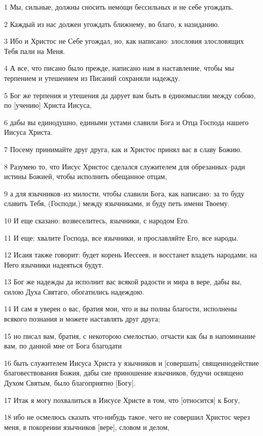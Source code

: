 \par 1 Мы, сильные, должны сносить немощи бессильных и не себе угождать.
\par 2 Каждый из нас должен угождать ближнему, во благо, к назиданию.
\par 3 Ибо и Христос не Себе угождал, но, как написано: злословия злословящих Тебя пали на Меня.
\par 4 А все, что писано было прежде, написано нам в наставление, чтобы мы терпением и утешением из Писаний сохраняли надежду.
\par 5 Бог же терпения и утешения да дарует вам быть в единомыслии между собою, по [учению] Христа Иисуса,
\par 6 дабы вы единодушно, едиными устами славили Бога и Отца Господа нашего Иисуса Христа.
\par 7 Посему принимайте друг друга, как и Христос принял вас в славу Божию.
\par 8 Разумею то, что Иисус Христос сделался служителем для обрезанных--ради истины Божией, чтобы исполнить обещанное отцам,
\par 9 а для язычников--из милости, чтобы славили Бога, как написано: за то буду славить Тебя, (Господи,) между язычниками, и буду петь имени Твоему.
\par 10 И еще сказано: возвеселитесь, язычники, с народом Его.
\par 11 И еще: хвалите Господа, все язычники, и прославляйте Его, все народы.
\par 12 Исаия также говорит: будет корень Иессеев, и восстанет владеть народами; на Него язычники надеяться будут.
\par 13 Бог же надежды да исполнит вас всякой радости и мира в вере, дабы вы, силою Духа Святаго, обогатились надеждою.
\par 14 И сам я уверен о вас, братия мои, что и вы полны благости, исполнены всякого познания и можете наставлять друг друга;
\par 15 но писал вам, братия, с некоторою смелостью, отчасти как бы в напоминание вам, по данной мне от Бога благодати
\par 16 быть служителем Иисуса Христа у язычников и [совершать] священнодействие благовествования Божия, дабы сие приношение язычников, будучи освящено Духом Святым, было благоприятно [Богу].
\par 17 Итак я могу похвалиться в Иисусе Христе в том, что [относится] к Богу,
\par 18 ибо не осмелюсь сказать что-нибудь такое, чего не совершил Христос через меня, в покорении язычников [вере], словом и делом,
